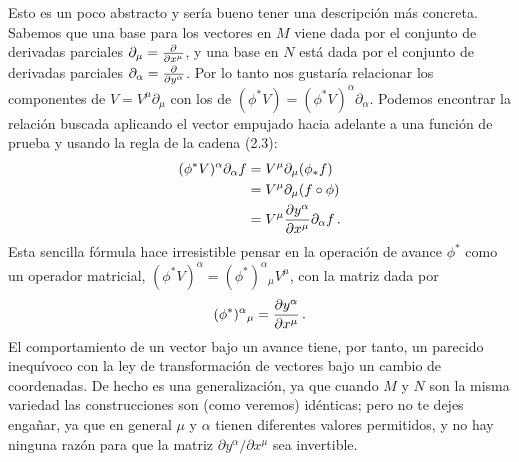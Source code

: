 \documentclass[11pt,b5paper,openany,twoside]{book}
\newcommand{\p}[1]{{\partial_{#1}}}
\begin{document}
Esto es un poco abstracto y sería bueno tener una descripción más concreta.
Sabemos que una base para los vectores en $M$ viene dada por el conjunto de derivadas parciales $\p\mu={{\partial}\over{\partial x^\mu}}$, y una base en $N$ está dada por el conjunto de derivadas parciales $\p\alpha= {{\partial}\over{\partial y^\alpha}}$.
Por lo tanto nos gustaría relacionar los componentes de $V=V^\mu\p\mu$ con los de $(\phi^*V)=(\phi^*V)^\alpha \p\alpha$.
Podemos encontrar la relación buscada aplicando el vector empujado hacia adelante a una función de prueba y usando la regla de la cadena (2.3):
\begin{align}
(\phi^*V)^\alpha\p\alpha f  &=  V^\mu\p\mu (\phi_* f) \notag \\
&=  V^\mu\p\mu (f\circ\phi) \notag \\
&=  V^\mu {{\partial y^\alpha}\over{\partial x^\mu}}\p\alpha f\,.
\label{5.3}
\end{align}
Esta sencilla fórmula hace irresistible pensar en la operación de avance $\phi^*$ como un operador matricial, $(\phi^*V)^\alpha = (\phi^*)^\alpha{}_\mu V^\mu$, con la matriz dada por
\begin{equation}
(\phi^*)^\alpha{}_\mu = {{\partial y^\alpha}\over{\partial x^\mu}}
\,.\label{5.4}
\end{equation}
El comportamiento de un vector bajo un avance tiene, por tanto, un parecido inequívoco con la ley de transformación de vectores bajo un cambio de coordenadas.
De hecho es una generalización, ya que cuando $M$ y $N$ son la misma variedad las construcciones son (como veremos) idénticas; pero no te dejes engañar, ya que en general $\mu$ y $\alpha$ tienen diferentes valores permitidos, y no hay ninguna razón para que la matriz ${{\partial y^\alpha} /{\partial x^\mu}}$ sea invertible.
\end{document}
